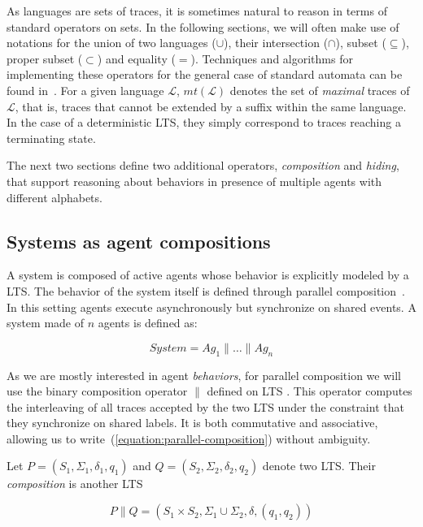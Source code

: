 As languages are sets of traces, it is sometimes natural to reason in terms of standard operators on sets. In the following sections, we will often make use of notations for the union of two languages ($\cup$), their intersection ($\cap$), subset ($\subseteq$), proper subset ($\subset$) and equality ($=$). Techniques and algorithms for implementing these operators for the general case of standard automata can be found in~\cite{Hopcroft:1979, Aho:1986}. For a given language $\mathcal{L}$, $mt(\mathcal{L})$ denotes the set of \emph{maximal} traces of $\mathcal{L}$, that is, traces that cannot be extended by a suffix within the same language. In the case of a deterministic LTS, they simply correspond to traces reaching a terminating state.

The next two sections define two additional operators, \emph{composition} and \emph{hiding}, that support reasoning about behaviors in presence of multiple agents with different alphabets.

\subsection{Systems as agent compositions}

A system is composed of active agents whose behavior is explicitly modeled by a LTS. The behavior of the system itself is defined through parallel composition~\cite{Hoare:1985}. In this setting agents execute asynchronously but synchronize on shared events. A system made of $n$ agents is defined as:

\begin{equation}
System = Ag_1 \parallel \ldots \parallel Ag_n
\label{equation:parallel-composition}
\end{equation}

As we are mostly interested in agent \emph{behaviors}, for parallel composition we will use the binary composition operator $\parallel$ defined on LTS \cite{Giannakopoulou:1999, Magee:1999}. This operator computes the interleaving of all traces accepted by the two LTS under the constraint that they synchronize on shared labels. It is both commutative and associative, allowing us to write~(\ref{equation:parallel-composition}) without ambiguity. 

Let $P = (S_1,\Sigma_1,\delta_1,q_{1})$ and $Q = (S_2,\Sigma_2,\delta_2,q_{2})$ denote two LTS. Their \emph{composition} is another LTS 

\begin{equation}
P \parallel Q = (S_1 \times S_2,\Sigma_1\cup\Sigma_2,\delta,(q_1,q_2))
\end{equation}

